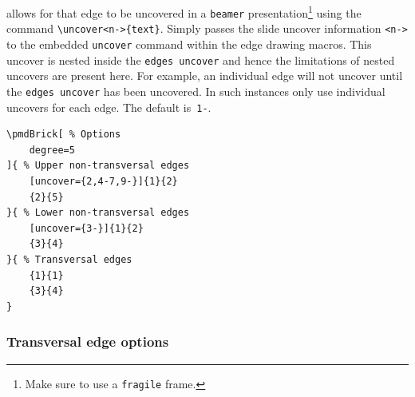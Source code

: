 \documentclass{ltxdoc}
\begin{document}
allows for that edge to be uncovered in a \texttt{beamer} presentation\footnote{Make sure to use a \texttt{fragile} frame.} using the command \verb`\uncover<n->{text}`. Simply passes the slide uncover information \verb`<n->` to the embedded \texttt{uncover} command within the edge drawing macros. This uncover is nested inside the \texttt{edges uncover} and hence the limitations of nested uncovers are present here. For example, an individual edge will not uncover until the \texttt{edges uncover} has been uncovered. In such instances only use individual uncovers for each edge. The default is~\texttt{1-}.
\begin{center}
    \begin{minipage}{\dimexpr0.85\textwidth-2\fboxrule-2\fboxsep\relax}
        \begin{minipage}[c]{0.4\linewidth}
\begin{verbatim}
\pmdBrick[ % Options
    degree=5
]{ % Upper non-transversal edges
    [uncover={2,4-7,9-}]{1}{2}
    {2}{5}
}{ % Lower non-transversal edges
    [uncover={3-}]{1}{2}
    {3}{4}
}{ % Transversal edges
    {1}{1}
    {3}{4}
}
\end{verbatim}
        \end{minipage}
        \hfill
        \begin{minipage}[c]{0.4\linewidth}
        \end{minipage}
    \end{minipage}%
\end{center}

\subsubsection{Transversal edge options} \label{sec: T edge/options}
\end{document}
